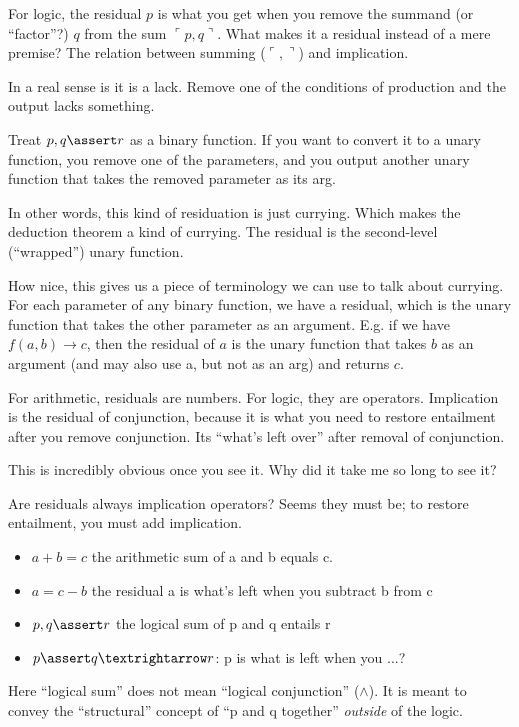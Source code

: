 \documentclass{article}
\begin{document}
For logic, the residual \(p\) is what you get when you remove the
summand (or ``factor''?) \(q\) from the sum \(\ulcorner
p,q\urcorner\). What makes it a residual instead of a mere premise?
The relation between summing (\(\ulcorner ,\urcorner\)) and
implication.

In a real sense is it is a lack. Remove one of the conditions of
production and the output lacks something.

Treat \(p,q\linfer r\) as a binary function. If you want to convert it
to a unary function, you remove one of the parameters, and you output
another unary function that takes the removed parameter as its arg.

In other words, this kind of residuation is just currying. Which makes
the deduction theorem a kind of currying. The residual is the
second-level (``wrapped'') unary function.

How nice, this gives us a piece of terminology we can use to talk
about currying. For each parameter of any binary function, we have a
residual, which is the unary function that takes the other parameter
as an argument. E.g. if we have \(f(a,b)→c\), then the residual of
\(a\) is the unary function that takes \(b\) as an argument (and may
also use a, but not as an arg) and returns \(c\).

For arithmetic, residuals are numbers. For logic, they are operators.
Implication is the residual of conjunction, because it is what you
need to restore entailment after you remove conjunction. Its ``what's
left over'' after removal of conjunction.

This is incredibly obvious once you see it. Why did it take me so long
to see it?

Are residuals always implication operators? Seems they must be; to
restore entailment, you must add implication.

\begin{itemize}
\item \(a + b = c\) the arithmetic sum of a and b equals c.
\item \(a = c - b\) the residual a is what's left when you subtract b from c
\item \(p,q\linfer r\) the logical sum of p and q entails r
\item \(p\linfer q→r\): p is what is left when you ...?
\end{itemize}

Here ``logical sum'' does not mean ``logical conjunction''
(\(\land\)). It is meant to convey the ``structural'' concept of ``p and
q together'' \textit{outside} of the logic.
\end{document}
